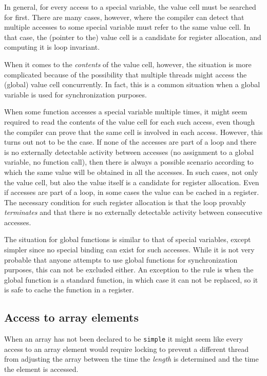 In general, for every access to a special variable, the value cell
must be searched for first.  There are many cases, however, where the
compiler can detect that multiple accesses to some special variable
must refer to the same value cell.  In that case, the (pointer to the)
value cell is a candidate for register allocation, and computing it is
loop invariant. 

When it comes to the \emph{contents} of the value cell, however, the
situation is more complicated because of the possibility that multiple
threads might access the (global) value cell concurrently.  In fact,
this is a common situation when a global variable is used for
synchronization purposes.

When some function accesses a special variable multiple times, it
might seem required to read the contents of the value cell for each
such access, even though the compiler can prove that the same cell is
involved in each access.  However, this turns out not to be the case.
If none of the accesses are part of a loop and there is no externally
detectable activity between accesses (no assignment to a global
variable, no function call), then there is always a possible scenario
according to which the same value will be obtained in all the
accesses.  In such cases, not only the value cell, but also the value
itself is a candidate for register allocation.  Even if accesses are
part of a loop, in some cases the value can be cached in a register.
The necessary condition for such register allocation is that the loop
provably \emph{terminates} and that there is no externally detectable
activity between consecutive accesses. 

The situation for global functions is similar to that of special
variables, except simpler since no special binding can exist for such
accesses.  While it is not very probable that anyone attempts to use
global functions for synchronization purposes, this can not be
excluded either.  An exception to the rule is when the global function
is a standard \cl{} function, in which case it can not be replaced, so
it is safe to cache the function in a register. 

\subsection{Access to array elements}

When an array has not been declared to be \texttt{simple} it might
seem like every access to an array element would require locking to
prevent a different thread from adjusting the array between the time
the \emph{length} is determined and the time the element is accessed.


